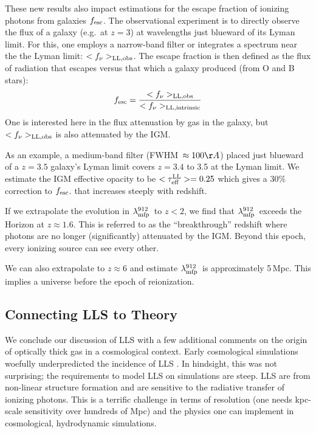 \documentclass[graybox]{svmult}
\def\mlmfp{\lambda_{\rm mfp}^{912}}
\def\lmfp{$\mlmfp$}
\def\mtll{\tau_{\rm eff}^{\rm LL}}
\begin{document}
These new results also impact estimations for the escape fraction
of ionizing photons from galaxies $f_{\rm esc}$.
The observational experiment is to directly observe the flux
of a galaxy (e.g.\ at $z=3$) at wavelengths
just blueward of its Lyman limit.  For this, one employs
a narrow-band filter \cite[e.g.]{nsk+13}
or integrates a spectrum near
the the Lyman limit: $<f_\nu>_{\rm LL,obs}$.
The escape fraction is then defined as the
flux of radiation that escapes
versus that which a galaxy produced (from O and B stars):
\begin{equation}
f_{\rm esc} = \frac{<f_\nu>_{\rm LL,obs}}{
<f_\nu>_{\rm LL,intrinsic}}
\end{equation}
One is interested here in the flux attenuation by gas in the galaxy,
but $<f_\nu>_{\rm LL,obs}$ is also attenuated by the IGM.

As an example, a medium-band filter (FWHM~$\approx 100\AA$)
placed just blueward of a $z=3.5$ galaxy's 
Lyman limit covers $z=3.4$ to 3.5 at the Lyman limit.
We estimate the IGM effective opacity to be $<\mtll> = 0.25$
which gives a 30\% correction to $f_{\rm esc}$.
that increases steeply with redshift.


If we extrapolate the evolution in \lmfp\ to $z<2$,
we find that \lmfp\ exceeds the Horizon at $z \approx 1.6$. 
This is referred to as the ``breakthrough'' redshift
where photons are no longer (significantly) attenuated
by the IGM.  Beyond this epoch, every ionizing source can 
see every other.

We can also extrapolate to $z \approx 6$
and estimate \lmfp\ is approximately 5\,Mpc.
This implies a universe before the epoch
of reionization.

\subsection{Connecting LLS to Theory}
\label{sec:lls_theory}

We conclude our discussion of LLS with a few additional comments
on the origin of optically thick gas in a cosmological context.
Early cosmological simulations woefully underpredicted
the incidence of LLS \cite{gkh+01}.   In hindsight, this
was not surprising; the requirements to model LLS on simulations
are steep.
LLS are from non-linear structure formation and
are sensitive to the radiative transfer of ionizing photons.
This is a terrific challenge in terms of resolution
(one needs kpc-scale sensitivity over hundreds of Mpc)
and the physics one can implement in cosmological, hydrodynamic
simulations.
\end{document}

